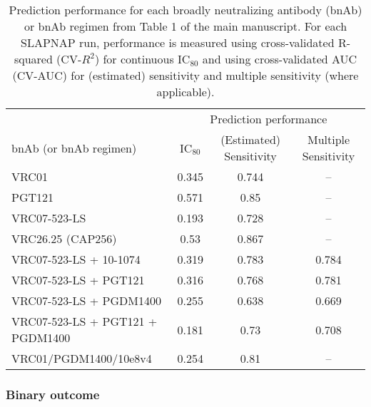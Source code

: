 \documentclass[10pt]{article}
\begin{document}
\begin{table}
    \centering
    \caption{Prediction performance for each broadly neutralizing antibody (bnAb) or bnAb regimen from Table 1 of the main manuscript. For each SLAPNAP run, performance is measured using cross-validated R-squared (CV-$R^2$) for continuous IC$_{80}$ and using cross-validated AUC (CV-AUC) for (estimated) sensitivity and multiple sensitivity (where applicable).}
    \begin{tabular}{l|ccc}
        & \multicolumn{3}{c}{Prediction performance} \\
        bnAb (or bnAb regimen) & IC$_{80}$ & (Estimated) Sensitivity & Multiple Sensitivity \\
        \hline
        VRC01 & 0.345 & 0.744 & -- \\
        PGT121 & 0.571 & 0.85 & -- \\
        VRC07-523-LS & 0.193 & 0.728 & --\\
        VRC26.25 (CAP256) & 0.53 & 0.867 & --\\
        VRC07-523-LS + 10-1074 & 0.319 & 0.783 & 0.784 \\
        VRC07-523-LS + PGT121 & 0.316 & 0.768 & 0.781 \\
        VRC07-523-LS + PGDM1400 & 0.255 & 0.638 & 0.669 \\
        VRC07-523-LS + PGT121 + PGDM1400 & 0.181 & 0.73 & 0.708 \\
        VRC01/PGDM1400/10e8v4 & 0.254 & 0.81 & --
    \end{tabular}
    \label{tab:perf}
\end{table}

\subsubsection{Binary outcome}
\end{document}
